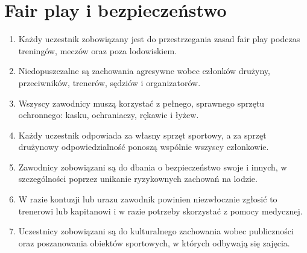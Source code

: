 \documentclass[12pt,a4paper]{article}
\let\stdsection\section
\renewcommand\section{\clearpage\stdsection}
\begin{document}
\section{Fair play i bezpieczeństwo}
\begin{enumerate}
  \item Każdy uczestnik zobowiązany jest do przestrzegania zasad fair play podczas treningów, meczów oraz poza lodowiskiem.
  \item Niedopuszczalne są zachowania agresywne wobec członków drużyny, przeciwników, trenerów, sędziów i organizatorów.
  \item Wszyscy zawodnicy muszą korzystać z pełnego, sprawnego sprzętu ochronnego: kasku, ochraniaczy, rękawic i łyżew.
  \item Każdy uczestnik odpowiada za własny sprzęt sportowy, a za sprzęt drużynowy odpowiedzialność ponoszą wspólnie wszyscy członkowie.
  \item Zawodnicy zobowiązani są do dbania o bezpieczeństwo swoje i innych, w szczególności poprzez unikanie ryzykownych zachowań na lodzie.
  \item W razie kontuzji lub urazu zawodnik powinien niezwłocznie zgłosić to trenerowi lub kapitanowi i w razie potrzeby skorzystać z pomocy medycznej.
  \item Uczestnicy zobowiązani są do kulturalnego zachowania wobec publiczności oraz poszanowania obiektów sportowych, w których odbywają się zajęcia.
\end{enumerate}
\end{document}

